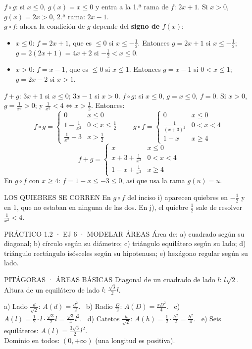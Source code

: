 $f\circ g$: si $x\le0$, $g(x)=x\le0$ y entra a la 1.ª rama de $f$: $2x+1$. Si $x>0$, $g(x)=2x>0$, 2.ª rama: $2x-1$.\\
$g\circ f$: ahora la condición de $g$ depende del \textbf{signo de $f(x)$}:
\begin{itemize}
\item $x\le0$: $f=2x+1$, que es $\le0$ si $x\le-\frac12$. Entonces $g=2x+1$ si $x\le-\frac12$; $g=2(2x+1)=4x+2$ si $-\frac12<x\le0$.
\item $x>0$: $f=x-1$, que es $\le0$ si $x\le1$. Entonces $g=x-1$ si $0<x\le1$; $g=2x-2$ si $x>1$.
\end{itemize}
$f+g$: $3x+1$ si $x\le0$; $3x-1$ si $x>0$.
$f\circ g$: si $x\le0$, $g=x\le0$, $f=0$. Si $x>0$, $g=\frac1{x^2}>0$; y $\frac1{x^2}<4\iff x>\frac12$. Entonces:
\[f\circ g=\begin{cases}0 & x\le0\\ 1-\frac1{x^2} & 0<x\le\frac12\\ \frac1{x^2}+3 & x>\frac12\end{cases}\qquad
g\circ f=\begin{cases}0 & x\le0\\ \frac1{(x+3)^2} & 0<x<4\\ 1-x & x\ge4\end{cases}\]
\[f+g=\begin{cases}x & x\le0\\ x+3+\frac1{x^2} & 0<x<4\\ 1-x+\frac1{x^2} & x\ge4\end{cases}\]
En $g\circ f$ con $x\ge4$: $f=1-x\le-3\le0$, así que usa la rama $g(u)=u$.
\begin{trampa}{LOS QUIEBRES SE CORREN}
En $g\circ f$ del inciso i) aparecen quiebres en $-\frac12$ y en $1$, que no estaban en ninguna de las dos. En j), el quiebre $\frac12$ sale de resolver $\frac1{x^2}<4$.
\end{trampa}

\begin{enunciado}{PRÁCTICO 1.2 · EJ 6 · MODELAR ÁREAS}
Área de: a) cuadrado según su diagonal; b) círculo según su diámetro; c) triángulo equilátero según su lado; d) triángulo rectángulo isósceles según su hipotenusa; e) hexágono regular según su lado.
\end{enunciado}
\begin{uso}{PITÁGORAS · ÁREAS BÁSICAS}
Diagonal de un cuadrado de lado $l$: $l\sqrt2$. Altura de un equilátero de lado $l$: $\frac{\sqrt3}2l$.
\end{uso}
a) Lado $\frac d{\sqrt2}$: $A(d)=\frac{d^2}2$. \ b) Radio $\frac D2$: $A(D)=\frac{\pi D^2}4$. \ c) $A(l)=\frac12\cdot l\cdot\frac{\sqrt3}2l=\frac{\sqrt3}4l^2$. \ d) Catetos $\frac h{\sqrt2}$: $A(h)=\frac12\cdot\frac{h^2}2=\frac{h^2}4$. \ e) Seis equiláteros: $A(l)=\frac{3\sqrt3}2l^2$.\\
Dominio en todos: $(0,+\infty)$ (una longitud es positiva).

